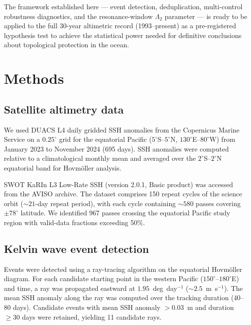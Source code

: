 \documentclass[11pt]{article}
\begin{document}
The framework established here --- event detection, deduplication, multi-control robustness diagnostics, and the resonance-window $\Lambda_2$ parameter --- is ready to be applied to the full 30-year altimetric record (1993--present) as a pre-registered hypothesis test to achieve the statistical power needed for definitive conclusions about topological protection in the ocean.

\section{Methods}
\label{sec:methods}

\subsection{Satellite altimetry data}

We used DUACS L4 daily gridded SSH anomalies\cite{Duacs2016} from the Copernicus Marine Service on a $0.25^\circ$ grid for the equatorial Pacific ($5^\circ$S--$5^\circ$N, $130^\circ$E--$80^\circ$W) from January 2023 to November 2024 (695 days). SSH anomalies were computed relative to a climatological monthly mean and averaged over the $2^\circ$S--$2^\circ$N equatorial band for Hovm\"oller analysis.

SWOT KaRIn L3 Low-Rate SSH (version 2.0.1, Basic product) was accessed from the AVISO archive\cite{Morrow2019,FuFerrari2008}. The dataset comprises 150 repeat cycles of the science orbit (${\sim}21$-day repeat period), with each cycle containing ${\sim}580$ passes covering $\pm 78^\circ$ latitude. We identified 967 passes crossing the equatorial Pacific study region with valid-data fractions exceeding 50\%.

\subsection{Kelvin wave event detection}

Events were detected using a ray-tracing algorithm on the equatorial Hovm\"oller diagram. For each candidate starting point in the western Pacific ($150^\circ$--$180^\circ$E) and time, a ray was propagated eastward at $1.95$~deg~day$^{-1}$ (${\sim}2.5$~m~s$^{-1}$). The mean SSH anomaly along the ray was computed over the tracking duration (40--80 days). Candidate events with mean SSH anomaly $> 0.03$~m and duration $\geq 30$ days were retained, yielding 11 candidate rays.
\end{document}
